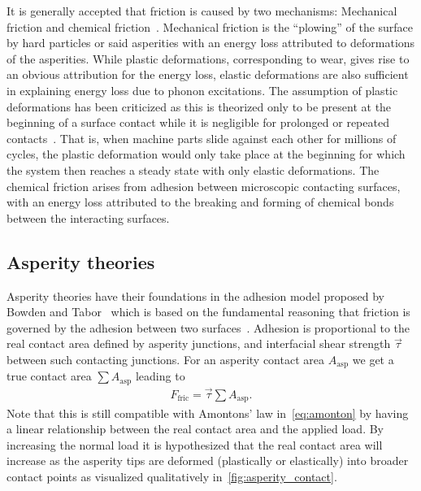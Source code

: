 It is generally accepted that friction is caused by two mechanisms: Mechanical
friction and chemical friction~\cite{kim_nano-scale_2009}. Mechanical
friction is the ``plowing'' of the surface by hard particles or said asperities
with an energy loss attributed to deformations of the asperities. While plastic
deformations, corresponding to wear, gives rise to an obvious attribution for
the energy loss, elastic deformations are also sufficient in explaining energy
loss due to phonon excitations. The assumption of plastic deformations
has been criticized as this is theorized only to be present at the beginning of
a surface contact while it is negligible for prolonged or repeated contacts~\cite{CARBONE20082555}. That is, when machine parts slide against each other for
millions of cycles, the plastic deformation would only take place at the beginning for which the system then reaches a steady state with only elastic deformations.
The chemical friction arises from adhesion between microscopic contacting
surfaces, with an energy loss attributed to the breaking and forming of chemical bonds between the interacting surfaces. 



\subsection{Asperity theories} %

Asperity theories have their foundations in the adhesion model proposed by Bowden and Tabor~\cite{bowden2001friction} which is based on the fundamental reasoning that friction is governed by the adhesion between two surfaces~\cite{Kim_2012}. Adhesion is proportional to the real contact area defined by asperity junctions, and interfacial shear strength $\vec{\tau}$ between such contacting junctions. For an asperity contact area $A_{\text{asp}}$ we get a true contact area $\sum A_{\text{asp}}$ leading to 
\begin{align*}
  F_\text{fric} = \vec{\tau} \sum A_{\text{asp}}.
\end{align*}
Note that this is still compatible with Amontons’ law in~\cref{eq:amonton} by having a linear relationship between the real contact area and the
applied load. By increasing the normal load it is hypothesized that the real contact area will increase as the asperity tips are deformed (plastically or elastically) into broader contact points as visualized qualitatively in~\cref{fig:asperity_contact}.

